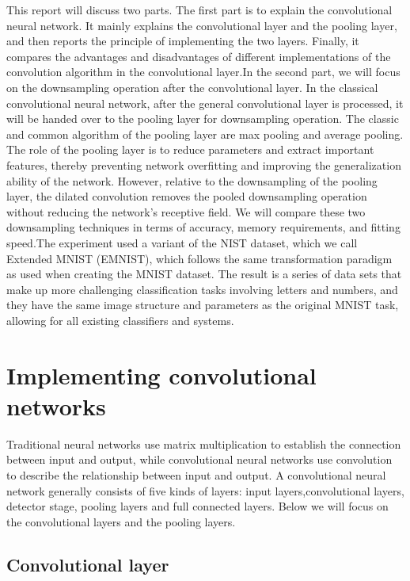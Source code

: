 \documentclass{article}
\begin{document}
This report will discuss two parts. The first part is to explain the convolutional neural network. It mainly explains the convolutional layer and the pooling layer, and then reports the principle of implementing the two layers. Finally, it compares the advantages and disadvantages of different implementations of the convolution algorithm in the convolutional layer.In the second part, we will focus on the downsampling operation after the convolutional layer. In the classical convolutional neural network, after the general convolutional layer is processed, it will be handed over to the pooling layer for downsampling operation. The classic and common algorithm of the pooling layer  are max pooling and average pooling. The role of the pooling layer is to reduce parameters and extract important features, thereby preventing network overfitting and improving the generalization ability of the network. However, relative to the downsampling of the pooling layer, the dilated convolution removes the pooled downsampling operation without reducing the network's receptive field. We will compare these two downsampling techniques in terms of accuracy, memory requirements, and fitting speed.The experiment used a variant of the NIST dataset, which we call Extended MNIST (EMNIST), which follows the same transformation paradigm as used when creating the MNIST dataset. The result is a series of data sets that make up more challenging classification tasks involving letters and numbers, and they have the same image structure and parameters as the original MNIST task, allowing for all existing classifiers and systems. 

\section{Implementing convolutional networks} 

Traditional neural networks use matrix multiplication to establish the connection between input and output, while convolutional neural networks use convolution to describe the relationship between input and output.
A convolutional neural network generally consists of five kinds of layers: input layers,convolutional layers, detector stage, pooling layers and  full connected layers. Below we will focus on the convolutional layers and the pooling layers.

\subsection{Convolutional layer}
\end{document}
